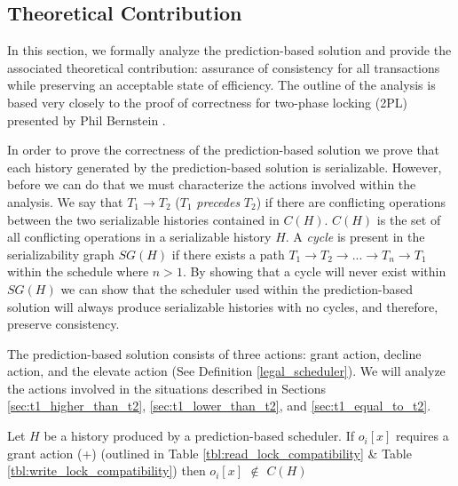 \subsection{Theoretical Contribution}
\label{pbs:theoretical_contribution}
In this section, we formally analyze the prediction-based solution and provide the associated theoretical contribution: assurance of consistency for all transactions while preserving an acceptable state of efficiency. The outline of the analysis is based very closely to the proof of correctness for two-phase locking (2PL) presented by Phil Bernstein \cite[pp. 53-56]{Bernstein_1986:CCR:17299}. 

In order to prove the correctness of the prediction-based solution we prove that each history generated by the prediction-based solution is serializable. However, before we can do that we must characterize the actions involved within the analysis. We say that $T_{1} \rightarrow T_{2}$ ($T_{1}$ \textit{precedes} $T_{2}$) if there are conflicting operations between the two serializable histories contained in $C(H)$. $C(H)$ is the set of all conflicting operations in a serializable history $H$. A \textit{cycle} is present in the serializability graph $SG(H)$ if there exists a path $T_{1} \rightarrow T_{2} \rightarrow ... \rightarrow T_{n} \rightarrow T_{1}$ within the schedule where $n > 1$. By showing that a cycle will never exist within $SG(H)$ we can show that the scheduler used within the prediction-based solution will always produce serializable histories with no cycles, and therefore, preserve consistency.

The prediction-based solution consists of three actions: grant action, decline action, and the elevate action (See Definition \ref{legal_scheduler}). We will analyze the actions involved in the situations described in Sections \ref{sec:t1_higher_than_t2}, \ref{sec:t1_lower_than_t2}, and \ref{sec:t1_equal_to_t2}.

\begin{proposition}
\label{prop:grant}
Let $H$ be a history produced by a prediction-based scheduler. If $o_{i}[x]$ requires a grant action (+) (outlined in Table \ref{tbl:read_lock_compatibility} \& Table \ref{tbl:write_lock_compatibility}) then $o_{i}[x]$ $\notin$ $C(H)$
\end{proposition}

